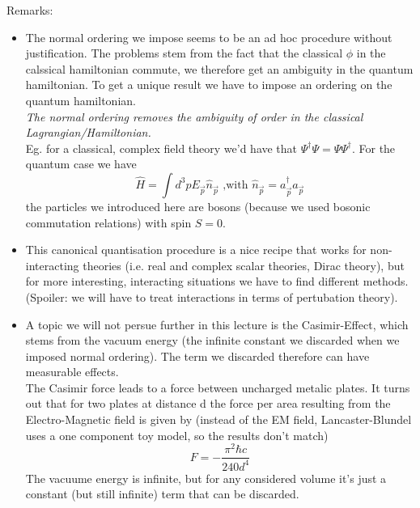 \documentclass{report}
\begin{document}
Remarks:
\begin{itemize}
	\item The normal ordering we impose seems to be an ad hoc procedure without justification. The problems stem from the fact that the classical $\phi $ in the calssical hamiltonian commute, we therefore get an ambiguity in the quantum hamiltonian. To get a unique result we have to impose an ordering on the quantum hamiltonian.\\ \emph{The normal ordering removes the ambiguity of order in the classical Lagrangian/Hamiltonian.}\\
		Eg. for a classical, complex field theory we'd have that $\Psi^\dagger \Psi = \Psi \Psi^\dagger$. For the quantum case we have \[
			\hat{H} = \int d^3p E_{\vec{p}} \hat{n}_{\vec{p}} \text{ ,with } \hat{n}_{\vec{p}} = a^\dagger_{\vec{p}} a_{\vec{p}}
		\] the particles we introduced here are bosons (because we used bosonic commutation relations) with spin $S= 0$.
	\item This canonical quantisation procedure is a nice recipe that works for non-interacting theories (i.e. real and complex scalar theories, Dirac theory), but for more interesting, interacting situations we have to find different methods. (Spoiler: we will have to treat interactions in terms of pertubation theory).
	\item A topic we will not persue further in this lecture is the Casimir-Effect, which stems from the vacuum energy (the infinite constant we discarded when we imposed normal ordering). The term we discarded therefore can have measurable effects.\\
		The Casimir force leads to a force between uncharged metalic plates. It turns out that for two plates at distance d the force per area resulting from the Electro-Magnetic field is given by (instead of the EM field, Lancaster-Blundel uses a one component toy model, so the results don't match) \[
		F = -\frac{\pi^2 \hbar c}{240 d^4}
	\] The vacuume energy is infinite, but for any considered volume it's just a constant (but still infinite) term that can be discarded.
\end{itemize}
\end{document}
